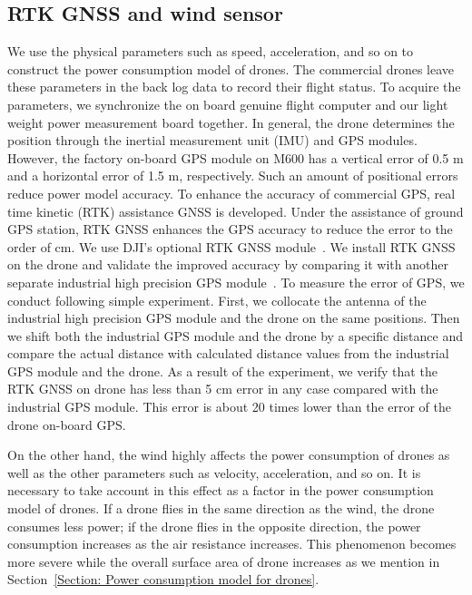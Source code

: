 \documentclass[journal]{./template/IEEEtran}
\begin{document}
\subsection{RTK GNSS and wind sensor}
We use the physical parameters such as speed, acceleration, and so on to construct the power consumption model of drones.
The commercial drones leave these parameters in the back log data to record their flight status.
To acquire the parameters, we synchronize the on board genuine flight computer and our light weight power measurement board together. In general, the drone determines the position through the inertial measurement unit (IMU) and GPS modules. 
However, the factory on-board GPS module on M600 has a vertical error of 0.5 m and a horizontal error of 1.5 m, respectively. 
Such an amount of positional errors reduce power model accuracy.
To enhance the accuracy of commercial GPS, real time kinetic (RTK) assistance GNSS is developed. Under the assistance of ground GPS station, RTK GNSS enhances the GPS accuracy to reduce the error to the order of cm. We use DJI's optional RTK GNSS module~\cite{ref_13}.
We install RTK GNSS on the drone and validate the improved accuracy by comparing it with another separate industrial high precision GPS module~\cite{ref_14}.
To measure the error of GPS, we conduct following simple experiment. First, we collocate the antenna of the industrial high precision GPS module and the drone on the same positions. Then we shift both the industrial GPS module and the drone by a specific distance and compare the actual distance with calculated distance values from the industrial GPS module and the drone.
As a result of the experiment, we verify that the RTK GNSS on drone has less than 5 cm error in any case compared with the industrial GPS module. This error is about 20 times lower than the error of the drone on-board GPS.

On the other hand, the wind highly affects the power consumption of drones as well as the other parameters such as velocity, acceleration, and so on.
It is necessary to take account in this effect as a factor in the power consumption model of drones. 
If a drone flies in the same direction as the wind, the drone consumes less power; if the drone flies in the opposite direction, the power consumption increases as the air resistance increases. 
This phenomenon becomes more severe while the overall surface area of drone increases as we mention in Section~\ref{Section: Power consumption model for drones}.
\end{document}
